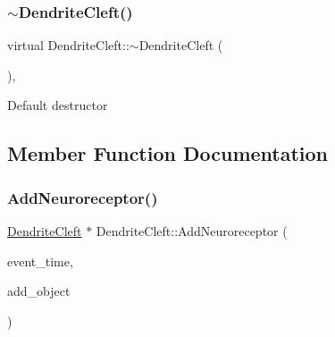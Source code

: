 \mbox{\label{classDendriteCleft_ad99958c45fa63f2f68b65d7e5ba45b32}} 
\subsubsection{\texorpdfstring{$\sim$\+Dendrite\+Cleft()}{~DendriteCleft()}}
{\footnotesize\ttfamily virtual Dendrite\+Cleft\+::$\sim$\+Dendrite\+Cleft (\begin{DoxyParamCaption}{ }\end{DoxyParamCaption})\hspace{0.3cm}{\ttfamily [inline]}, {\ttfamily [virtual]}}

Default destructor 

\subsection{Member Function Documentation}
\mbox{\label{classDendriteCleft_a65901c5659ca5eac161a26f15e0f437b}} 
\subsubsection{\texorpdfstring{Add\+Neuroreceptor()}{AddNeuroreceptor()}}
{\footnotesize\ttfamily \mbox{\hyperlink{classDendriteCleft}{Dendrite\+Cleft}} $\ast$ Dendrite\+Cleft\+::\+Add\+Neuroreceptor (\begin{DoxyParamCaption}\item[{std\+::chrono\+::time\+\_\+point$<$ \mbox{\hyperlink{universe_8h_a0ef8d951d1ca5ab3cfaf7ab4c7a6fd80}{Clock}} $>$}]{event\+\_\+time,  }\item[{\mbox{\hyperlink{classDendriteCleft}{Dendrite\+Cleft}} $\ast$}]{add\+\_\+object }\end{DoxyParamCaption})}

\mbox{\label{classDendriteCleft_a6d29f577ff12366f8f51804b13468395}} 
